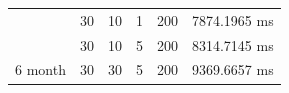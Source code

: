 \begin{table}[!tb]
{\begin{tabular}{|c|c|c|c|c|c|}
\multicolumn{1}{|c|}{}          & 30                           & 10                         & 1                          & 200                     & 7874.1965 ms                            \\ \cline{2-6}
\multicolumn{1}{|c|}{}           & 30                           & 10                         & 5                          & 200                     & 8314.7145 ms                            \\ \cline{2-6}
\multicolumn{1}{|c|}{\multirow{-4}{*}{6 month}}           & 30                           & 30                         & 5                          & 200                     & 9369.6657 ms                            \\ \hline
\end{tabular}
}\vspace{-1em}
\end{table}




